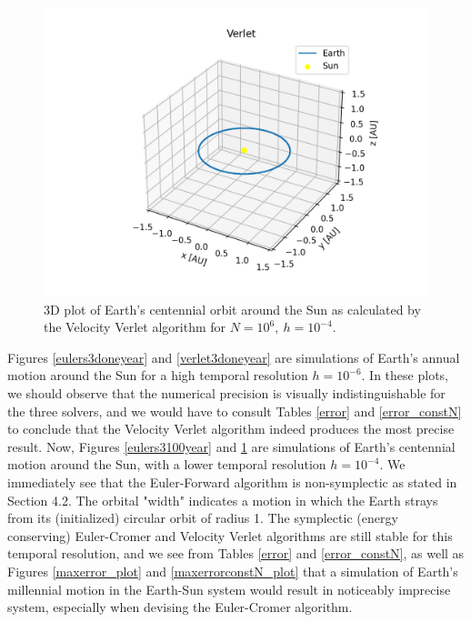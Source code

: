 	\begin{figure}[h!]
		\centering
		\includegraphics[width=0.6\linewidth]{Figure/verlet_100years.png}
		\caption{3D plot of Earth's centennial orbit around the Sun as calculated by the Velocity Verlet algorithm for $N = 10^6,\ h = 10^{-4}$.}
		\label{verlet3d100year}
	\end{figure}
	\newpage
	
	Figures \ref{eulers3doneyear} and \ref{verlet3doneyear} are simulations of Earth's annual motion around the Sun for a high temporal resolution $h = 10^{-6}$. In these plots, we should observe that the numerical precision is visually indistinguishable for the three solvers, and we would have to consult Tables \ref{error} and \ref{error_constN} to conclude that the Velocity Verlet algorithm indeed produces the most precise result. Now, Figures \ref{eulers3100year} and \ref{verlet3d100year} are simulations of Earth's centennial motion around the Sun, with a lower temporal resolution $h = 10^{-4}$. We immediately see that the Euler-Forward algorithm is non-symplectic as stated in Section 4.2. The orbital "width" indicates a motion in which the Earth strays from its (initialized) circular orbit of radius 1. The symplectic (energy conserving) Euler-Cromer and Velocity Verlet algorithms are still stable for this temporal resolution, and we see from Tables \ref{error} and \ref{error_constN}, as well as Figures \ref{maxerror_plot} and \ref{maxerrorconstN_plot} that a simulation of Earth's millennial motion in the Earth-Sun system would result in noticeably imprecise system, especially when devising the Euler-Cromer algorithm.\\ 
	
